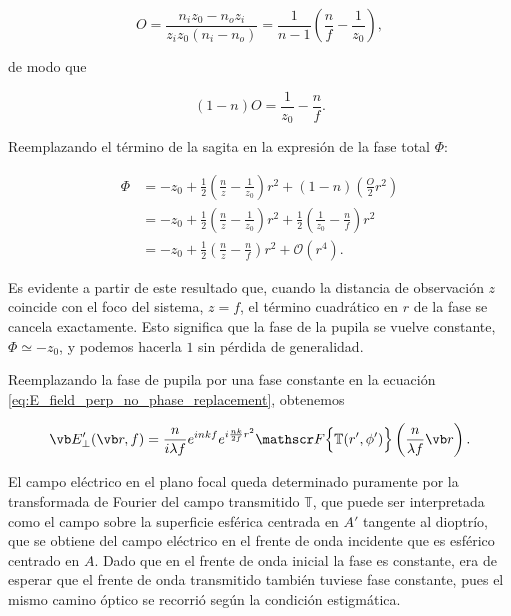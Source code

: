 \begin{equation}
    O
    =
    \frac{n_i z_0 - n_o z_i}{z_i z_0 (n_i - n_o)}
    =
    \frac{1}{n - 1}
    \left(
    \frac{n}{f}
    -
    \frac{1}{z_0}
    \right),
\end{equation}

de modo que

\begin{equation}
    (1-n)O
    =
    \frac{1}{z_0}
    -
    \frac{n}{f}.
\end{equation}

Reemplazando el término de la sagita en la expresión de la fase total $\Phi$:

\begin{align}
    \Phi
    &=
    -z_0
    +
    \frac{1}{2}
    \left(
    \frac{n}{z}
    -
    \frac{1}{z_0}
    \right)r^2
    +
    (1-n)
    \left(
    \frac{O}{2}r^2
    \right)
    \nonumber
    \\
    &=
    -z_0
    +
    \frac{1}{2}
    \left(
    \frac{n}{z}
    -
    \frac{1}{z_0}
    \right)r^2
    +
    \frac{1}{2}
    \left(
    \frac{1}{z_0}
    -
    \frac{n}{f}
    \right)r^2
    \nonumber
    \\
    &=
    -z_0
    +
    \frac{1}{2}
    \left(
    \frac{n}{z}
    -
    \frac{n}{f}
    \right)r^2
    +
    \mathcal{O}(r^4).
\end{align}

Es evidente a partir de este resultado que, cuando la distancia de observación $z$ coincide con el foco del sistema, $z=f$, el término cuadrático en $r$ de la fase se cancela exactamente. Esto significa que la fase de la pupila se vuelve constante, $\Phi\simeq -z_0$, y podemos hacerla $1$ sin pérdida de generalidad.

Reemplazando la fase de pupila por una fase constante en la ecuación \eqref{eq:E_field_perp_no_phase_replacement}, obtenemos

\begin{equation}
  \vb E'_\perp(\vb r, f)
  =
  \frac{n}{i\lambda f}e^{inkf}e^{i\frac{nk}{2f}r^2}
  \mathscr F
  \Big\{
  \mathbb T(r', \phi')
  \Big\}
  \left(
  \frac{n}{\lambda f}\vb r
  \right).
  \label{eq:E_field_pupil_phase_and_TT}
\end{equation}

El campo eléctrico en el plano focal queda determinado puramente por la transformada de Fourier del campo transmitido $\mathbb{T}$, que puede ser interpretada como el campo sobre la superficie esférica centrada en $A'$ tangente al dioptrío, que se obtiene del campo eléctrico en el frente de onda incidente que es esférico centrado en $A$. Dado que en el frente de onda inicial la fase es constante, era de esperar que el frente de onda transmitido también tuviese fase constante, pues el mismo camino óptico se recorrió según la condición estigmática.

